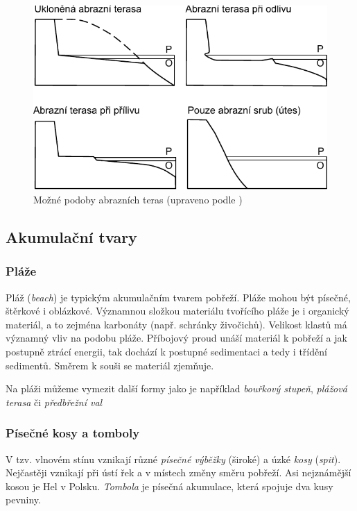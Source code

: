 \begin{figure}[h]
	\centering
	\includegraphics[width=1\linewidth]{obrazky/marine/utesy_terasy}
	\caption{Možné podoby abrazních teras (upraveno podle \textcite{birdCoastalGeomorphologyIntroduction2008})}
	\label{fig:abrazni_terasa}
\end{figure}



\subsection{Akumulační tvary}
\subsubsection{Pláže}
Pláž (\textit{beach}) je typickým akumulačním tvarem pobřeží. Pláže mohou být písečné, štěrkové i oblázkové. Významnou složkou materiálu tvořícího pláže je i organický materiál, a to zejména karbonáty (např. schránky živočichů). Velikost klastů má významný vliv na podobu pláže. Příbojový proud unáší materiál k pobřeží a jak postupně ztrácí energii, tak dochází k postupné sedimentaci a tedy i třídění sedimentů. Směrem k souši se materiál zjemňuje. 

Na pláži můžeme vymezit další formy jako je například \emph{bouřkový stupeň}, \emph{plážová terasa} či \emph{předbřežní val}

\subsubsection{Písečné kosy a tomboly}
V tzv. vlnovém stínu vznikají různé \emph{písečné výběžky} (široké) a úzké \emph{kosy} (\textit{spit}). Nejčastěji vznikají při ústí řek a v místech změny směru pobřeží. Asi nejznámější kosou je Hel v Polsku.
\emph{Tombola} je písečná akumulace, která spojuje dva kusy pevniny.

